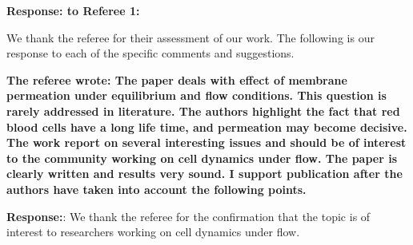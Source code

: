 \documentclass[12pt]{article}
\begin{document}
\newpage
\vspace{0.5cm}
{\large \bf {\bf Response:} to Referee 1:}
\vspace{0.5cm}

We thank the referee for their assessment of our work. The following is
our response to each of the specific comments and suggestions.


{\bf The referee wrote:
The paper deals with effect of membrane permeation under equilibrium
and flow conditions. This question is rarely addressed in literature.
The authors highlight the fact that red blood cells have a long life
time, and permeation may become decisive. The work report on several
interesting issues and should be of interest to the community working
on cell dynamics under flow. The paper is clearly written and results
very sound. I support publication after the authors have taken into
account the following points.
}

\noindent
{\bf Response:}: We thank the referee for the confirmation that the topic is of interest to researchers working on cell dynamics under flow.
\end{document}
